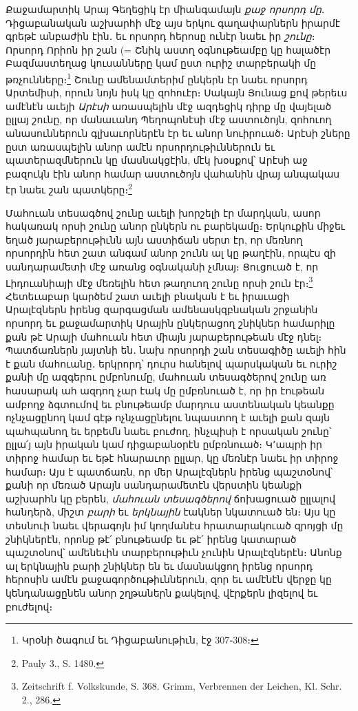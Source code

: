 \documentclass{article}
\begin{document}
{Քաջամարտիկ Արայ Գեղեցիկ էր միանգամայն \emph{քաջ որսորդ մը}․ Դիցաբանական աշխարհի մէջ այս երկու գաղափարներն իրարմէ գրեթէ անբաժին էին․ եւ որսորդ հերոսը ունէր նաեւ իր \emph{շունը}։ Որսորդ Որիոն իր շան (= Շնիկ աստղ օգնութեամբը կը հալածէր Բազմաստեղաց կուսանները կամ ըստ ուրիշ տարբերակի մը թռչունները։\footnote{Կրօնի ծագում եւ Դիցաբանութիւն, էջ 307֊308։} Շունը ամենամտերիմ ընկերն էր նաեւ որսորդ Արտեմիսի, որուն նոյն իսկ կը զոհուէր։ Սակայն Յունաց քով թերեւս ամէնէն աւեյի \emph{Արէսի} առասպելին մէջ ազդեցիկ դիրք մը վայելած ըլլայ շունը, որ մանաւանդ Պեղոպոնէսի մէջ աստուծոյն, զոհուող անասուններուն գլխաւորներէն էր եւ անոր նուիրուած։ Արէսի շները ըստ առասպելին անոր ամէն որսորդութիւններուն եւ պատերազմներուն կը մասնակցէին, մէկ խօսքով՝ Արէսի աջ բազուկն էին անոր համար աստուծոյն վահանին վրայ անպակաս էր նաեւ շան պատկերը։\footnote{Pauly 3., S. 1480.}

Մահուան տեսագծով շունը աւելի խորշելի էր մարդկան, ասոր հակառակ որսի շունը անոր ընկերն ու բարեկամը։ Երկուքին միջեւ եղած յարաբերութիւնն այն աստիճան սերտ էր, որ մեռնող որսորդին հետ շատ անգամ անոր շունն ալ կը թաղէին, որպէս զի սանդարամետի մէջ առանց օգնականի չմնայ։ Ցուցուած է, որ Լիդուանիայի մէջ մեռելին հետ թաղուող շունը որսի շուն էր։\footnote{Zeitschrift f. Volkskunde, S. 368. Grimm, Verbrennen der Leichen, Kl. Schr. 2., 286.} Հետեւաբար կարծեմ շատ աւելի բնական է եւ իրաւացի Արալէզներն իրենց զարգացման ամենասկզբնական շրջանին որսորդ եւ քաջամարտիկ Արային ընկերացող շնիկներ համարիլը քան թէ Արայի մահուան հետ միայն յարաբերութեան մէջ դնել։ Պատճառներն յայտնի են․ նախ որսորդի շան տեսագիծը աւելի հին է քան մահուանը․ երկրորդ՝ դուրս հանելով պարսկական եւ ուրիշ քանի մը ազգերու ըմբոնումը, մահուան տեսագծերով շունը առ հասարակ ահ ազդող չար էակ մը ըմբռնուած է, որ իր էութեան ամբողջ ձգտումով եւ բնութեամբ մարդուս աստենական կեանքը ոչնչացընող կամ գէթ ոչնչացընելու նպաստող է աւելի քան զայն պահպանող եւ երբեմն նաեւ բուժող, ինչպիսի է որսական շունը՝ ըլլա՛յ այն իրական կամ դիցաբանօրէն ըմբռնուած։ Կ՚ապրի իր տիրոջ համար եւ եթէ հնարաւոր ըլլար, կը մեռնէր նաեւ իր տիրոջ համար։ Այս է պատճառն, որ մեր Արալէզներն իրենց պաշտօնով՝ քանի որ մեռած Արայն սանդարամետէն վերստին կեանքի աշխարհն կը բերեն, \emph{մահուան տեսագծերով} ճոխացուած ըլլալով հանդերձ, միշտ \emph{բարի} եւ \emph{երկնային} էակներ նկատուած են։ Այս կը տեսնուի նաեւ վերագոյն իմ կողմանէս հրատարակուած զրոյցի մը շնիկներէն, որոնք թէ՛ բնութեամբ եւ թէ՛ իրենց կատարած պաշտօնով՝ ամենեւին տարբերութիւն չունին Արալէզներէն։ Անոնք ալ երկնային բարի շնիկներ են եւ մասնակցող իրենց որսորդ հերոսին ամէն քաջագործութիւններուն, զոր եւ ամէնէն վերջը կը կենդանացընեն անոր շղթաներն քակելով, վէրքերն լիզելով եւ բուժելով։

}
\end{document}
